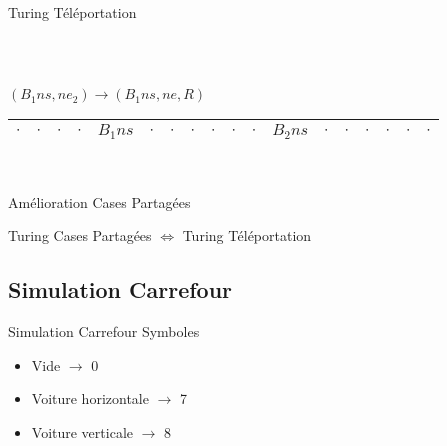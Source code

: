 \documentclass[12pt]{beamer}
\begin{document}
\begin{frame}{Turing Téléportation}
\begin{center}
\begin{tabular}{|c|c|c|c|c|c|c|c|c|c|c|c|c|c|c|c|c|c|}
\end{tabular}\\

        \pause

\vspace{0.5cm}

    $(B_1ns,ne_2) \longrightarrow (B_1ns, ne, R)$\\
    

\begin{tabular}{|c|c|c|c|c|c|c|c|c|c|c|c|c|c|c|c|c|c|}\hline
     $\cdot$ & $\cdot$ & $\cdot$ & $\cdot$ & $B_1ns$ & $\cdot$ & $\cdot$ & $\cdot$ & $\cdot$ & $\cdot$ & $\cdot$ & $B_2ns$ & $\cdot$ & $\cdot$ & $\cdot$ & $\cdot$ & $\cdot$ & $\cdot$ \\\hline    
     
\end{tabular}\\

    \end{center}
\end{frame}

\begin{frame}{Amélioration Cases Partagées}
\begin{center}
    \begin{tcolorbox}[colframe=red, hbox]
    \large Turing Cases Partagées $\Longleftrightarrow$ Turing Téléportation
\end{tcolorbox}
\end{center}

\end{frame}

\subsection{Simulation Carrefour}
\begin{frame}{Simulation Carrefour}
    Symboles
    \begin{itemize}
    \vspace{1cm}
        \item Vide $\longrightarrow$ 0 \\
        \vspace{1cm}
        \item Voiture horizontale $\longrightarrow$ 7 \\
        \vspace{1cm}
        \item Voiture verticale $\longrightarrow$ 8 \\
    \end{itemize}
\end{frame}
\end{document}
